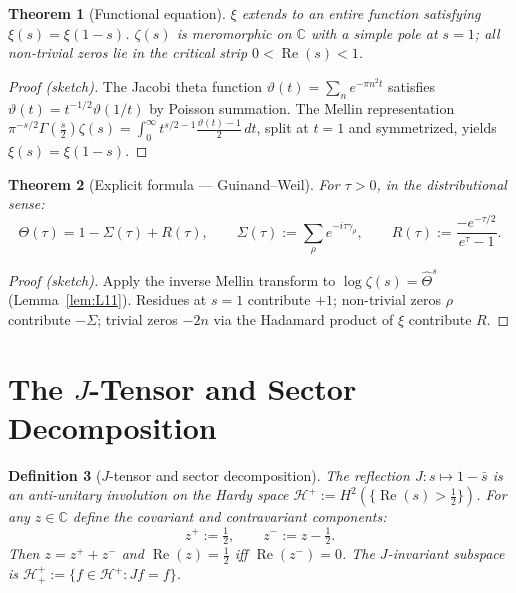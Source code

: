 \documentclass[12pt,a4paper]{article}
\newtheorem{theorem}{Theorem}[section]
\newtheorem{definition}[theorem]{Definition}
\theoremstyle{remark}
\begin{document}
\begin{theorem}[Functional equation]\label{thm:FE}
$\xi$ extends to an entire function satisfying $\xi(s)=\xi(1-s)$.
$\zeta(s)$ is meromorphic on $\mathbb{C}$ with a simple pole at $s=1$;
all non-trivial zeros lie in the critical strip $0<\operatorname{Re}(s)<1$.
\end{theorem}
\begin{proof}[Proof (sketch)]
The Jacobi theta function $\vartheta(t)=\sum_n e^{-\pi n^2 t}$
satisfies $\vartheta(t)=t^{-1/2}\vartheta(1/t)$ by Poisson summation.
The Mellin representation
$\pi^{-s/2}\Gamma(\tfrac{s}{2})\zeta(s)
=\int_0^\infty t^{s/2-1}\tfrac{\vartheta(t)-1}{2}\,dt$,
split at $t=1$ and symmetrized, yields $\xi(s)=\xi(1-s)$.
\end{proof}

\begin{theorem}[Explicit formula --- Guinand--Weil]\label{thm:EF}
For $\tau>0$, in the distributional sense:
\[
\Theta(\tau) = 1 - \Sigma(\tau) + R(\tau),
\qquad
\Sigma(\tau):=\sum_\rho e^{-i\tau\gamma_\rho},
\qquad
R(\tau):=\frac{-e^{-\tau/2}}{e^\tau-1}.
\]
\end{theorem}
\begin{proof}[Proof (sketch)]
Apply the inverse Mellin transform to $\log\zeta(s)=\hat\Theta^s$
(Lemma~\ref{lem:L11}). Residues at $s=1$ contribute $+1$;
non-trivial zeros $\rho$ contribute $-\Sigma$;
trivial zeros $-2n$ via the Hadamard product of $\xi$ contribute $R$.
\end{proof}


\section{The $J$-Tensor and Sector Decomposition}
\label{sec:J}

\begin{definition}[$J$-tensor and sector decomposition]\label{def:J}
The reflection $J:s\mapsto1-\bar{s}$ is an anti-unitary involution
on the Hardy space
$\mathcal{H}^+:=H^2(\{\operatorname{Re}(s)>\tfrac{1}{2}\})$.
For any $z\in\mathbb{C}$ define the \emph{covariant} and
\emph{contravariant} components:
\[
z^+ := \tfrac{1}{2}, \qquad z^- := z-\tfrac{1}{2}.
\]
Then $z=z^++z^-$ and $\operatorname{Re}(z)=\tfrac{1}{2}$ iff
$\operatorname{Re}(z^-)=0$.
The $J$-invariant subspace is
$\mathcal{H}^+_+:=\{f\in\mathcal{H}^+:Jf=f\}$.
\end{definition}
\end{document}
